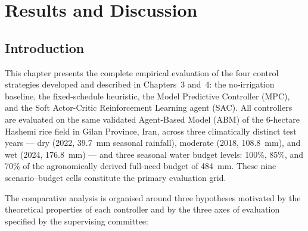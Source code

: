 %

\newcommand{\TODO}[1]{\textbf{\textcolor{red}{[TODO: #1]}}}

\chapter{Results and Discussion}
\label{ch:results}

\section{Introduction}
\label{sec:results_intro}

This chapter presents the complete empirical evaluation of the four control strategies
developed and described in Chapters~3 and~4: the no-irrigation baseline, the fixed-schedule
heuristic, the Model Predictive Controller (MPC), and the Soft Actor-Critic Reinforcement
Learning agent (SAC).
All controllers are evaluated on the same validated Agent-Based Model (ABM) of the
6-hectare Hashemi rice field in Gilan Province, Iran, across three climatically distinct
test years — dry (2022, 39.7~mm seasonal rainfall), moderate (2018, 108.8~mm), and
wet (2024, 176.8~mm) — and three seasonal water budget levels: 100\%, 85\%, and 70\%
of the agronomically derived full-need budget of 484~mm.
These nine scenario--budget cells constitute the primary evaluation grid.

The comparative analysis is organised around three hypotheses motivated by the theoretical
properties of each controller and by the three axes of evaluation specified by the
supervising committee:

